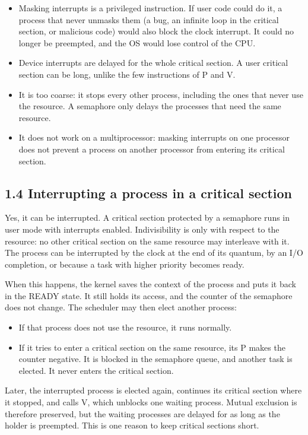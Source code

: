 \documentclass[letterpaper, 11pt]{article}
\newcommand{\1}{\mathds{1}}	%
\theoremstyle{definition}
\begin{document}
\begin{itemize}
  \item Masking interrupts is a privileged instruction. If user code could do it, a process that never unmasks them (a bug, an infinite loop in the critical section, or malicious code) would also block the clock interrupt. It could no longer be preempted, and the OS would lose control of the CPU.
  \item Device interrupts are delayed for the whole critical section. A user critical section can be long, unlike the few instructions of P and V.
  \item It is too coarse: it stops every other process, including the ones that never use the resource. A semaphore only delays the processes that need the same resource.
  \item It does not work on a multiprocessor: masking interrupts on one processor does not prevent a process on another processor from entering its critical section.
\end{itemize}

\subsection*{1.4 Interrupting a process in a critical section}

Yes, it can be interrupted. A critical section protected by a semaphore runs in user mode with interrupts enabled. Indivisibility is only with respect to the resource: no other critical section on the same resource may interleave with it. The process can be interrupted by the clock at the end of its quantum, by an I/O completion, or because a task with higher priority becomes ready.

When this happens, the kernel saves the context of the process and puts it back in the READY state. It still holds its access, and the counter of the semaphore does not change. The scheduler may then elect another process:
\begin{itemize}
  \item If that process does not use the resource, it runs normally.
  \item If it tries to enter a critical section on the same resource, its P makes the counter negative. It is blocked in the semaphore queue, and another task is elected. It never enters the critical section.
\end{itemize}
Later, the interrupted process is elected again, continues its critical section where it stopped, and calls V, which unblocks one waiting process. Mutual exclusion is therefore preserved, but the waiting processes are delayed for as long as the holder is preempted. This is one reason to keep critical sections short.
\end{document}
